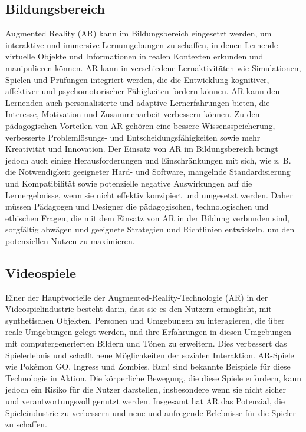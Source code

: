 \subsection{Bildungsbereich}

Augmented Reality (AR) kann im Bildungsbereich eingesetzt werden, um interaktive und immersive Lernumgebungen zu schaffen, in denen Lernende virtuelle Objekte und Informationen in realen Kontexten erkunden und manipulieren können. AR kann in verschiedene Lernaktivitäten wie Simulationen, Spielen und Prüfungen integriert werden, die die Entwicklung kognitiver, affektiver und psychomotorischer Fähigkeiten fördern können. AR kann den Lernenden auch personalisierte und adaptive Lernerfahrungen bieten, die Interesse, Motivation und Zusammenarbeit verbessern können. Zu den pädagogischen Vorteilen von AR gehören eine bessere Wissensspeicherung, verbesserte Problemlösungs- und Entscheidungsfähigkeiten sowie mehr Kreativität und Innovation. Der Einsatz von AR im Bildungsbereich bringt jedoch auch einige Herausforderungen und Einschränkungen mit sich, wie z. B. die Notwendigkeit geeigneter Hard- und Software, mangelnde Standardisierung und Kompatibilität sowie potenzielle negative Auswirkungen auf die Lernergebnisse, wenn sie nicht effektiv konzipiert und umgesetzt werden. Daher müssen Pädagogen und Designer die pädagogischen, technologischen und ethischen Fragen, die mit dem Einsatz von AR in der Bildung verbunden sind, sorgfältig abwägen und geeignete Strategien und Richtlinien entwickeln, um den potenziellen Nutzen zu maximieren. \cite{Wu2013CurrentSO}

\subsection{Videospiele}

Einer der Hauptvorteile der Augmented-Reality-Technologie (AR) in der Videospielindustrie besteht darin, dass sie es den Nutzern ermöglicht, mit synthetischen Objekten, Personen und Umgebungen zu interagieren, die über reale Umgebungen gelegt werden, und ihre Erfahrungen in diesen Umgebungen mit computergenerierten Bildern und Tönen zu erweitern. Dies verbessert das Spielerlebnis und schafft neue Möglichkeiten der sozialen Interaktion. AR-Spiele wie Pokémon GO, Ingress und Zombies, Run! sind bekannte Beispiele für diese Technologie in Aktion. Die körperliche Bewegung, die diese Spiele erfordern, kann jedoch ein Risiko für die Nutzer darstellen, insbesondere wenn sie nicht sicher und verantwortungsvoll genutzt werden. Insgesamt hat AR das Potenzial, die Spieleindustrie zu verbessern und neue und aufregende Erlebnisse für die Spieler zu schaffen. \cite{Das2017AugmentedRV}

